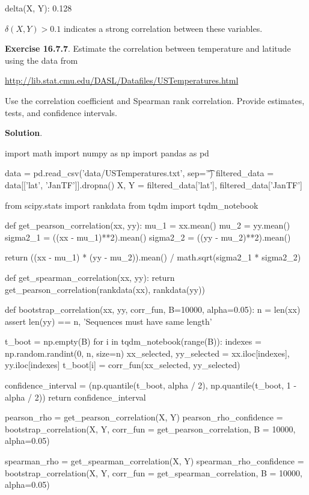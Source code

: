 \begin{console}
delta(X, Y): 0.128
\end{console}

\(\delta(X, Y) > 0.1\) indicates a strong correlation between these
variables.

\textbf{Exercise 16.7.7}. Estimate the correlation between temperature
and latitude using the data from

\url{http://lib.stat.cmu.edu/DASL/Datafiles/USTemperatures.html}

Use the correlation coefficient and Spearman rank correlation. Provide
estimates, tests, and confidence intervals.

\textbf{Solution}.

\begin{python}
import math
import numpy as np
import pandas as pd

data = pd.read_csv('data/USTemperatures.txt', sep='\t')
filtered_data = data[['lat', 'JanTF']].dropna()
X, Y = filtered_data['lat'], filtered_data['JanTF']
\end{python}

\begin{python}
from scipy.stats import rankdata
from tqdm import tqdm_{n}otebook

def get_pearson_correlation(xx, yy):
    mu_{1} = xx.mean()
    mu_{2} = yy.mean()
    sigma2_{1} = ((xx - mu_{1})**2).mean()
    sigma2_{2} = ((yy - mu_{2})**2).mean()
    
    return ((xx - mu_{1}) * (yy - mu_{2})).mean() / math.sqrt(sigma2_{1} * sigma2_{2})

def get_spearman_correlation(xx, yy):
    return get_pearson_correlation(rankdata(xx), rankdata(yy))

def bootstrap_correlation(xx, yy, corr_fun, B=10000, alpha=0.05):
    n = len(xx)
    assert len(yy) == n, 'Sequences must have same length'
    
    t_boot = np.empty(B)
    for i in tqdm_{n}otebook(range(B)):
        indexes = np.random.randint(0, n, size=n)
        xx_selected, yy_selected = xx.iloc[indexes], yy.iloc[indexes]
        t_boot[i] = corr_fun(xx_selected, yy_selected)
        
    confidence_interval = (np.quantile(t_boot, alpha / 2), np.quantile(t_boot, 1 - alpha / 2))
    return confidence_interval
\end{python}

\begin{python}
pearson_rho = get_pearson_correlation(X, Y)
pearson_rho_confidence = bootstrap_correlation(X, Y, corr_fun = get_pearson_correlation, B = 10000, alpha=0.05)

spearman_rho = get_spearman_correlation(X, Y)
spearman_rho_confidence = bootstrap_correlation(X, Y, corr_fun = get_spearman_correlation, B = 10000, alpha=0.05)
\end{python}


